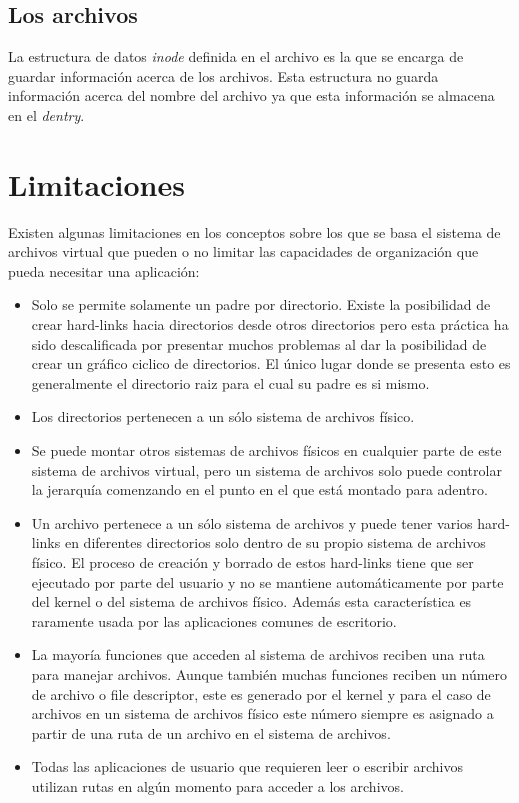 \subsection{Los archivos}

La estructura de datos \textit{inode} definida en el archivo  es la que se encarga de guardar información acerca de los archivos. Esta estructura no guarda información acerca del nombre del archivo ya que esta información se almacena en el \textit{dentry}.


\section{Limitaciones}

Existen algunas limitaciones en los conceptos sobre los que se basa el sistema de archivos virtual que pueden o no limitar las capacidades de organización que pueda necesitar una aplicación:

\begin{itemize}
\item Solo se permite solamente un padre por directorio. Existe la posibilidad de crear hard-links hacia directorios desde otros directorios pero esta práctica ha sido descalificada por presentar muchos problemas al dar la posibilidad de crear un gráfico ciclico de directorios. El único lugar donde se presenta esto es generalmente el directorio raiz para el cual su padre es si mismo.
\item Los directorios pertenecen a un sólo sistema de archivos físico.
\item Se puede montar otros sistemas de archivos físicos en cualquier parte de este sistema de archivos virtual, pero un sistema de archivos solo puede controlar la jerarquía comenzando en el punto en el que está montado para adentro.
\item Un archivo pertenece a un sólo sistema de archivos y puede tener varios hard-links en diferentes directorios solo dentro de su propio sistema de archivos físico. El proceso de creación y borrado de estos hard-links tiene que ser ejecutado por parte del usuario y no se mantiene automáticamente por parte del kernel o del sistema de archivos físico. Además esta característica es raramente usada por las aplicaciones comunes de escritorio.
\item La mayoría funciones que acceden al sistema de archivos reciben una ruta para manejar archivos. Aunque también muchas funciones reciben un número de archivo o file descriptor, este es generado por el kernel y para el caso de archivos en un sistema de archivos físico este número siempre es asignado a partir de una ruta de un archivo en el sistema de archivos.
\item Todas las aplicaciones de usuario que requieren leer o escribir archivos utilizan rutas en algún momento para acceder a los archivos.
\end{itemize}

